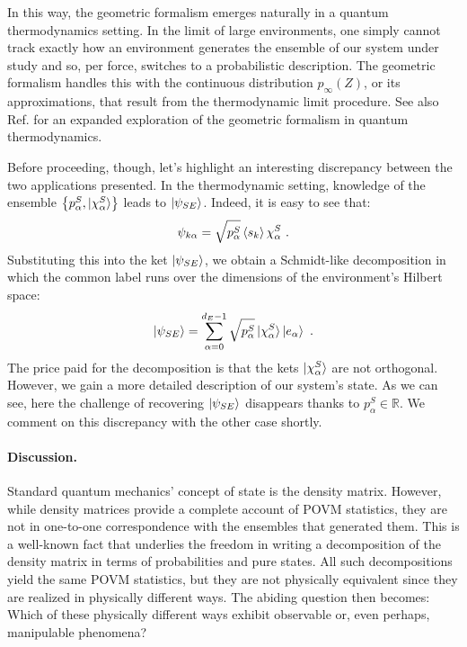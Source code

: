 \documentclass[draft,nofootinbib,pre,twocolumn,showpacs,showkeys,preprintnumbers,floatfix]{revtex4-1}
\newcommand{\1}{\mathbbm{1}}
\begin{document}
In this way, the geometric formalism emerges naturally in a quantum
thermodynamics setting. In the limit of large environments, one simply cannot
track exactly how an environment generates the ensemble of our system under
study and so, per force, switches to a probabilistic description. The geometric
formalism handles this with the continuous distribution $p_\infty(Z)$, or its
approximations, that result from the thermodynamic limit procedure. See also
Ref. \cite{Anza20b} for an expanded exploration of the geometric formalism in
quantum thermodynamics.

Before proceeding, though, let's highlight an interesting discrepancy between
the two applications presented. In the thermodynamic setting, knowledge of the
ensemble $\left\{ p_\alpha^S, \ket{\chi_\alpha^S}\right\}$ leads to $\ket{\psi_{SE}}$. 
Indeed, it is easy to see that:
\begin{align*}
\psi_{k\alpha} = \sqrt{p_\alpha^S} \braket{s_k}{\chi_\alpha^S}
  ~.
\end{align*}
Substituting this into the ket $\ket{\psi_{SE}}$, we obtain a Schmidt-like
decomposition in which the common label runs over the dimensions of the 
environment's Hilbert space:
\begin{align*}
\ket{\psi_{SE}} = \sum_{\alpha=0}^{d_E-1}
  \sqrt{p_\alpha^S} \ket{\chi_\alpha^S}\ket{e_\alpha}
  ~.
\end{align*}
The price paid for the decomposition is that the kets $\ket{\chi_\alpha^S}$
are not orthogonal. However, we gain a more detailed description of our
system's state. As we can see, here the challenge of recovering
$\ket{\psi_{SE}}$ disappears thanks to $p_\alpha^S \in \mathbb{R}$. We comment
on this discrepancy with the other case shortly.

\paragraph*{Discussion.}
Standard quantum mechanics' concept of state is the density matrix. However,
while density matrices provide a complete account of POVM statistics, they are
not in one-to-one correspondence with the ensembles that generated them. This
is a well-known fact that underlies the freedom in writing a decomposition of
the density matrix in terms of probabilities and pure states.  All such
decompositions yield the same POVM statistics, but they are not physically
equivalent since they are realized in physically different ways. The abiding
question then becomes: Which of these physically different ways exhibit
observable or, even perhaps, manipulable phenomena?
\end{document}
